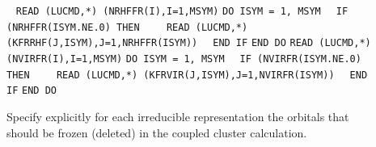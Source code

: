 \begin{description}
\item[]  \verb| |\newline
    \verb|READ (LUCMD,*) (NRHFFR(I),I=1,MSYM)|\newline
    \verb|DO ISYM = 1, MSYM|\newline
    \verb|  IF (NRHFFR(ISYM.NE.0) THEN|\newline
    \verb|    READ (LUCMD,*) (KFRRHF(J,ISYM),J=1,NRHFFR(ISYM))|\newline
    \verb|  END IF|\newline
    \verb|END DO|\newline
    \verb|READ (LUCMD,*) (NVIRFR(I),I=1,MSYM)|\newline
    \verb|DO ISYM = 1, MSYM|\newline
    \verb|  IF (NVIRFR(ISYM.NE.0) THEN|\newline
    \verb|    READ (LUCMD,*) (KFRVIR(J,ISYM),J=1,NVIRFR(ISYM))|\newline
    \verb|  END IF|\newline
    \verb|END DO|

    Specify explicitly for each irreducible representation the
    orbitals that should be frozen (deleted) in the coupled cluster
    calculation.
 

\end{description}
